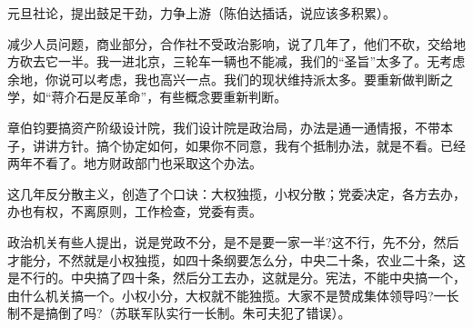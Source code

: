 元旦社论，提出鼓足干劲，力争上游（陈伯达插话，说应该多积累）。

减少人员问题，商业部分，合作社不受政治影响，说了几年了，他们不砍，交给地方砍去它一半。我一进北京，三轮车一辆也不能减，我们的“圣旨”太多了。无考虑余地，你说可以考虑，我也高兴一点。我们的现状维持派太多。要重新做判断之学，如“蒋介石是反革命”，有些概念要重新判断。

章伯钧要搞资产阶级设计院，我们设计院是政治局，办法是通一通情报，不带本子，讲讲方针。搞个协定如何，如果你不同意，我有个抵制办法，就是不看。已经两年不看了。地方财政部门也采取这个办法。

这几年反分散主义，创造了个口诀：大权独揽，小权分散；党委决定，各方去办，办也有权，不离原则，工作检查，党委有责。

政治机关有些人提出，说是党政不分，是不是要一家一半?这不行，先不分，然后才能分，不然就是小权独揽，如四十条纲要怎么分，中央二十条，农业二十条，这是不行的。中央搞了四十条，然后分工去办，这就是分。宪法，不能中央搞一个，由什么机关搞一个。小权小分，大权就不能独揽。大家不是赞成集体领导吗?一长制不是搞倒了吗?（苏联军队实行一长制。朱可夫犯了错误）。


